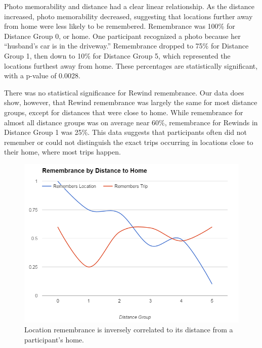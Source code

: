 \documentclass{sigchi}
\begin{document}
Photo memorability and distance had a clear linear relationship. As the distance increased, photo memorability decreased, suggesting that locations further away from home were less likely to be remembered. Remembrance was 100\% for Distance Group 0, or home. One participant recognized a photo because her ``husband's car is in the driveway.'' Remembrance dropped to 75\% for Distance Group 1, then down to 10\% for Distance Group 5, which represented the locations furthest away from home. These percentages are statistically significant, with a p-value of 0.0028. 

There was no statistical significance for Rewind remembrance. Our data does show, however, that Rewind remembrance was largely the same for most distance groups, except for distances that were close to home. While remembrance for almost all distance groups was on average near 60\%, remembrance for Rewinds in Distance Group 1 was 25\%. This data suggests that participants often did not remember or could not distinguish the exact trips occurring in locations close to their home, where most trips happen.  

\begin{figure}
	\centering
	\includegraphics[width=1\linewidth]{distance}
	\caption{Location remembrance is inversely correlated to its distance from a participant's home.}
	\label{fig:distancememory}
\end{figure}
\end{document}
